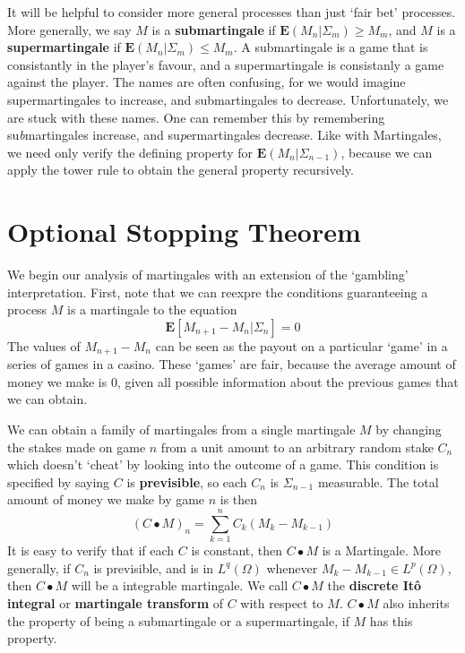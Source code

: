 It will be helpful to consider more general processes than just `fair bet' processes. More generally, we say $M$ is a {\bf submartingale} if $\mathbf{E}(M_n|\Sigma_m) \geq M_m$, and $M$ is a {\bf supermartingale} if $\mathbf{E}(M_n|\Sigma_m) \leq M_m$. A submartingale is a game that is consistantly in the player's favour, and a supermartingale is consistanly a game against the player. The names are often confusing, for we would imagine supermartingales to increase, and submartingales to decrease. Unfortunately, we are stuck with these names. One can remember this by remembering su{\it b}martingales increase, and su{\it p}ermartingales decrease. Like with Martingales, we need only verify the defining property for $\mathbf{E}(M_n|\Sigma_{n-1})$, because we can apply the tower rule to obtain the general property recursively.

\section{Optional Stopping Theorem}

We begin our analysis of martingales with an extension of the `gambling' interpretation. First, note that we can reexpre the conditions guaranteeing a process $M$ is a martingale to the equation
%
\[ \mathbf{E}[M_{n+1} - M_n | \Sigma_n] = 0 \]
%
The values of $M_{n+1} - M_n$ can be seen as the payout on a particular `game' in a series of games in a casino. These `games' are fair, because the average amount of money we make is 0, given all possible information about the previous games that we can obtain.

We can obtain a family of martingales from a single martingale $M$ by changing the stakes made on game $n$ from a unit amount to an arbitrary random stake $C_n$ which doesn't `cheat' by looking into the outcome of a game. This condition is specified by saying $C$ is {\bf previsible}, so each $C_n$ is $\Sigma_{n-1}$ measurable. The total amount of money we make by game $n$ is then
%
\[ (C \bullet M)_n = \sum_{k = 1}^n C_k(M_k - M_{k-1}) \]
%
It is easy to verify that if each $C$ is constant, then $C \bullet M$ is a Martingale. More generally, if $C_n$ is previsible, and is in $L^q(\Omega)$ whenever $M_k - M_{k-1} \in L^p(\Omega)$, then $C \bullet M$ will be a integrable martingale. We call $C \bullet M$ the {\bf discrete It\^{o} integral} or {\bf martingale transform} of $C$ with respect to $M$. $C \bullet M$ also inherits the property of being a submartingale or a supermartingale, if $M$ has this property.

